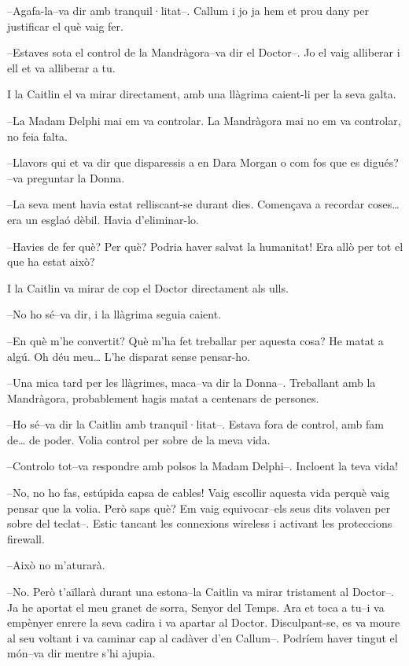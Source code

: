 --Agafa-la--va dir amb tranquil·litat--. Callum i jo ja hem et prou dany
per justificar el què vaig fer.

--Estaves sota el control de la Mandràgora--va dir el Doctor--. Jo el
vaig alliberar i ell et va alliberar a tu.

I la Caitlin el va mirar directament, amb una llàgrima caient-li per la
seva galta.

--La Madam Delphi mai em va controlar. La Mandràgora mai no em va
controlar, no feia falta.

--Llavors qui et va dir que disparessis a en Dara Morgan o com fos que
es digués? --va preguntar la Donna.

--La seva ment havia estat relliscant-se durant dies. Començava a
recordar coses\ldots{} era un esglaó dèbil. Havia d'eliminar-lo.

--Havies de fer què? Per què? Podria haver salvat la humanitat! Era allò
per tot el que ha estat això?

I la Caitlin va mirar de cop el Doctor directament als ulls.

--No ho sé--va dir, i la llàgrima seguia caient.

--En què m'he convertit? Què m'ha fet treballar per aquesta cosa? He
matat a algú. Oh déu meu\ldots{} L'he disparat sense pensar-ho.

--Una mica tard per les llàgrimes, maca--va dir la Donna--. Treballant
amb la Mandràgora, probablement hagis matat a centenars de persones.

--Ho sé--va dir la Caitlin amb tranquil·litat--. Estava fora de control,
amb fam de\ldots{} de poder. Volia control per sobre de la meva vida.

--Controlo tot--va respondre amb polsos la Madam Delphi--. Incloent la
teva vida!

--No, no ho fas, estúpida capsa de cables! Vaig escollir aquesta vida
perquè vaig pensar que la volia. Però saps què? Em vaig equivocar--els
seus dits volaven per sobre del teclat--. Estic tancant les connexions
wireless i activant les proteccions firewall.

--Això no m'aturarà.

--No. Però t'aïllarà durant una estona--la Caitlin va mirar tristament
al Doctor--. Ja he aportat el meu granet de sorra, Senyor del Temps. Ara
et toca a tu--i va empènyer enrere la seva cadira i va apartar al
Doctor. Disculpant-se, es va moure al seu voltant i va caminar cap al
cadàver d'en Callum--. Podríem haver tingut el món--va dir mentre s'hi
ajupia.

